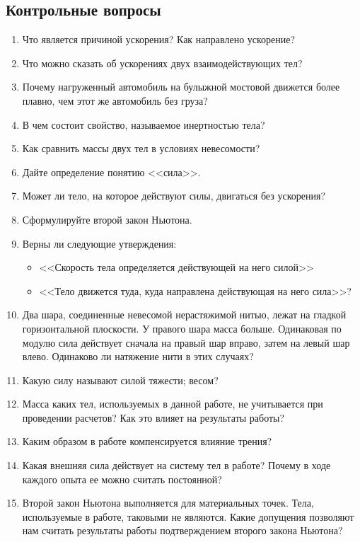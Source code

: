 \documentclass[a4paper, 12pt]{extarticle}
\begin{document}
\subsection{Контрольные вопросы}
\begin{enumerate}
\item Что является причиной ускорения? Как направлено ускорение?
\item Что можно сказать об ускорениях двух взаимодействующих тел?
\item Почему нагруженный автомобиль на булыжной мостовой движется более плавно, чем этот же автомобиль без груза?  %
\item В чем состоит свойство, называемое инертностью тела?
\item Как сравнить массы двух тел в условиях невесомости?
\item Дайте определение понятию <<сила>>. 
\item Может ли тело, на которое действуют силы, двигаться без ускорения? 
\item Сформулируйте второй закон Ньютона.
\item Верны ли следующие утверждения:
	\begin{itemize}
	\item <<Скорость тела определяется действующей на него силой>> 
	\item <<Тело движется туда, куда направлена действующая на него сила>>?
	\end{itemize}
\item Два шара, соединенные невесомой нерастяжимой нитью, лежат на гладкой горизонтальной плоскости. У правого шара масса больше. Одинаковая по модулю сила действует сначала на правый шар вправо, затем на левый шар влево. Одинаково ли натяжение нити в этих случаях? 
\item Какую силу называют силой тяжести; весом?
\item Масса каких тел, используемых в данной работе, не учитывается при проведении расчетов? Как это влияет на результаты работы? 
\item Каким образом в работе компенсируется влияние трения?
\item Какая внешняя сила действует на систему тел в работе? Почему в ходе каждого опыта ее можно считать постоянной? 
\item Второй закон Ньютона выполняется для материальных точек. Тела, используемые в работе, таковыми не являются. Какие допущения позволяют нам считать результаты работы подтверждением второго закона Ньютона? %
\end{enumerate}
\end{document}
